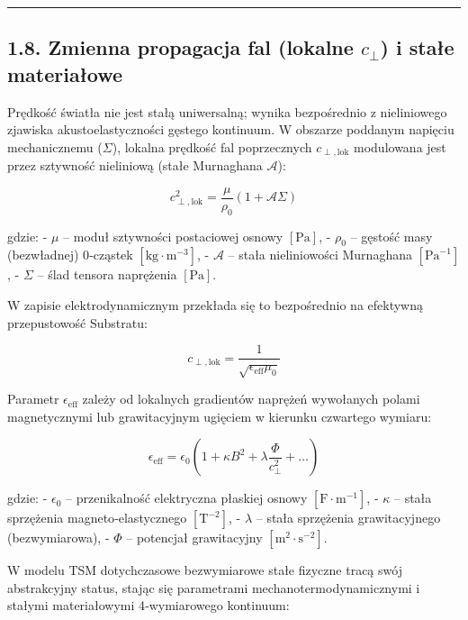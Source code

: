 \documentclass[
  letterpaper,
  DIV=11,
  numbers=noendperiod]{scrartcl}
\numberwithin{equation}{subsection}
\begin{document}
\begin{center}\rule{0.5\linewidth}{0.5pt}\end{center}

\subsection{\texorpdfstring{1.8. Zmienna propagacja fal (lokalne
\(c_{\perp}\)) i stałe
materiałowe}{1.8. Zmienna propagacja fal (lokalne c\_\{\textbackslash perp\}) i stałe materiałowe}}\label{zmienna-propagacja-fal-lokalne-c_perp-i-staux142e-materiaux142owe}

Prędkość światła nie jest stałą uniwersalną; wynika bezpośrednio z
nieliniowego zjawiska akustoelastyczności gęstego kontinuum. W obszarze
poddanym napięciu mechanicznemu (\(\Sigma\)), lokalna prędkość fal
poprzecznych \(c_{\perp,\text{lok}}\) modulowana jest przez sztywność
nieliniową (stałe Murnaghana \(\mathcal{A}\)):

\[c_{\perp,\text{lok}}^2 = \frac{\mu}{\rho_0} \left( 1 + \mathcal{A} \Sigma \right) \tag{1.8.1}\]

gdzie: - \(\mu\) -- moduł sztywności postaciowej osnowy \([\text{Pa}]\),
- \(\rho_0\) -- gęstość masy (bezwładnej) 0‑cząstek
\([\text{kg} \cdot \text{m}^{-3}]\), - \(\mathcal{A}\) -- stała
nieliniowości Murnaghana \([\text{Pa}^{-1}]\), - \(\Sigma\) -- ślad
tensora naprężenia \([\text{Pa}]\).

W zapisie elektrodynamicznym przekłada się to bezpośrednio na efektywną
przepustowość Substratu:

\[c_{\perp,\text{lok}} = \frac{1}{\sqrt{\epsilon_{\text{eff}} \mu_0}} \tag{1.8.2}\]

Parametr \(\epsilon_{\text{eff}}\) zależy od lokalnych gradientów
naprężeń wywołanych polami magnetycznymi lub grawitacyjnym ugięciem w
kierunku czwartego wymiaru:

\[\epsilon_{\text{eff}} = \epsilon_0 \left(1 + \kappa B^2 + \lambda \frac{\Phi}{c_{\perp}^2} + \dots\right) \tag{1.8.3}\]

gdzie: - \(\epsilon_0\) -- przenikalność elektryczna płaskiej osnowy
\([\text{F} \cdot \text{m}^{-1}]\), - \(\kappa\) -- stała sprzężenia
magneto‑elastycznego \([\text{T}^{-2}]\), - \(\lambda\) -- stała
sprzężenia grawitacyjnego (bezwymiarowa), - \(\Phi\) -- potencjał
grawitacyjny \([\text{m}^2 \cdot \text{s}^{-2}]\).

W modelu TSM dotychczasowe bezwymiarowe stałe fizyczne tracą swój
abstrakcyjny status, stając się parametrami mechanotermodynamicznymi i
stałymi materiałowymi 4‑wymiarowego kontinuum:
\end{document}
